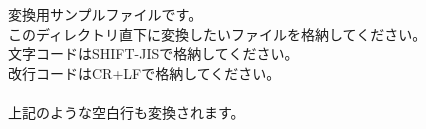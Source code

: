 ﻿変換用サンプルファイルです。\\
このディレクトリ直下に変換したいファイルを格納してください。\\
文字コードはSHIFT-JISで格納してください。\\
改行コードはCR+LFで格納してください。\\
\\
上記のような空白行も変換されます。\\
